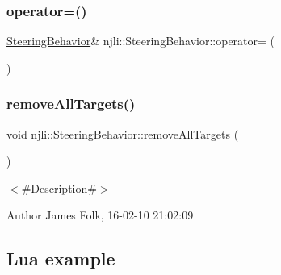 \mbox{\label{classnjli_1_1_steering_behavior_a4b99b614e4f9ed862949fe0bbe4a374b}} 
\subsubsection{\texorpdfstring{operator=()}{operator=()}}
{\footnotesize\ttfamily \mbox{\hyperlink{classnjli_1_1_steering_behavior}{Steering\+Behavior}}\& njli\+::\+Steering\+Behavior\+::operator= (\begin{DoxyParamCaption}\item[{const \mbox{\hyperlink{classnjli_1_1_steering_behavior}{Steering\+Behavior}} \&}]{ }\end{DoxyParamCaption})\hspace{0.3cm}{\ttfamily [protected]}}

\mbox{\label{classnjli_1_1_steering_behavior_a607058ee31eae853823c0ecd1cf5b81d}} 
\subsubsection{\texorpdfstring{remove\+All\+Targets()}{removeAllTargets()}}
{\footnotesize\ttfamily \mbox{\hyperlink{_thread_8h_af1e856da2e658414cb2456cb6f7ebc66}{void}} njli\+::\+Steering\+Behavior\+::remove\+All\+Targets (\begin{DoxyParamCaption}{ }\end{DoxyParamCaption})}



$<$\#\+Description\#$>$ 

\begin{DoxyAuthor}{Author}
James Folk, 16-\/02-\/10 21\+:02\+:09
\end{DoxyAuthor}
\hypertarget{classnjli_1_1_steering_behavior_wander_ex1}{}\subsection{Lua example}\label{classnjli_1_1_steering_behavior_wander_ex1}

